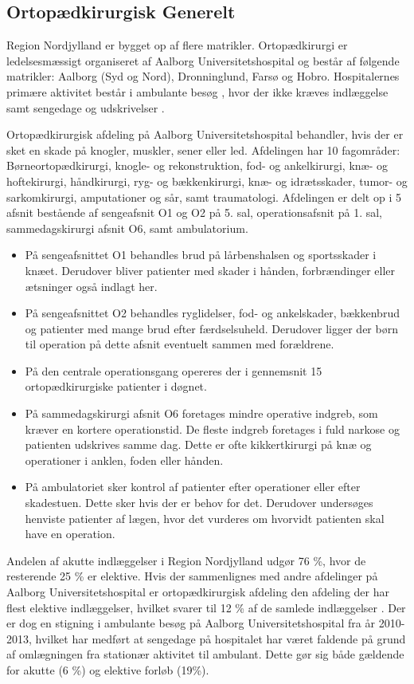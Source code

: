 \subsection{Ortopædkirurgisk Generelt}
Region Nordjylland er bygget op af flere matrikler. Ortopædkirurgi er ledelsesmæssigt organiseret af Aalborg Universitetshospital og består af følgende matrikler: Aalborg (Syd og Nord), Dronninglund, Farsø og Hobro. Hospitalernes primære aktivitet består i ambulante besøg , hvor der ikke kræves indlæggelse samt sengedage  og udskrivelser  \cite{ROLFS KILDE}. 

Ortopædkirurgisk afdeling på Aalborg Universitetshospital behandler, hvis der er sket en skade  på knogler, muskler, sener eller led. Afdelingen har 10 fagområder: Børneortopædkirurgi, knogle- og rekonstruktion, fod- og ankelkirurgi, knæ- og hoftekirurgi, håndkirurgi, ryg- og bækkenkirurgi, knæ- og idrætsskader, tumor- og sarkomkirurgi, amputationer og sår, samt traumatologi.
Afdelingen er delt op i 5 afsnit bestående af sengeafsnit O1 og O2 på 5. sal, operationsafsnit på 1. sal, sammedagskirurgi afsnit O6, samt ambulatorium.  \cite{Aalborg2016}

\begin{itemize}
\item På sengeafsnittet O1 behandles brud på lårbenshalsen og sportsskader i knæet. Derudover bliver patienter med skader i hånden, forbrændinger eller ætsninger også indlagt her.
\item På sengeafsnittet O2 behandles ryglidelser, fod- og ankelskader, bækkenbrud og patienter med mange brud efter færdselsuheld. Derudover ligger der børn til operation på dette afsnit eventuelt sammen med forældrene. 
\item På den centrale operationsgang opereres der i gennemsnit 15 ortopædkirurgiske patienter i døgnet. 
\item På sammedagskirurgi afsnit O6 foretages mindre operative indgreb, som kræver en kortere operationstid. De fleste indgreb foretages i fuld narkose og patienten udskrives samme dag. Dette er ofte kikkertkirurgi på knæ og operationer i anklen, foden eller hånden. 
\item På ambulatoriet sker kontrol af patienter efter operationer eller efter skadestuen. Dette sker hvis der er behov for det. Derudover undersøges henviste patienter af lægen, hvor det vurderes om hvorvidt patienten skal have en operation. \cite{Aalborg2016}
\end{itemize}


Andelen af akutte indlæggelser i Region Nordjylland udgør 76 \%, hvor de resterende 25 \% er elektive. Hvis der sammenlignes med andre afdelinger på Aalborg Universitetshospital er ortopædkirurgisk afdeling den afdeling der har flest elektive indlæggelser, hvilket svarer til 12 \% af de samlede indlæggelser . Der er dog en stigning i ambulante besøg på Aalborg Universitetshospital fra år 2010-2013, hvilket har medført at sengedage på hospitalet har været faldende på grund af omlægningen fra stationær aktivitet til ambulant. Dette gør sig både gældende for akutte (6 \%) og elektive forløb (19\%). 